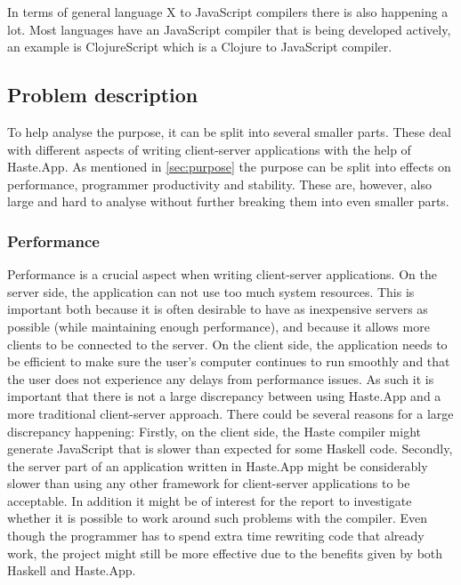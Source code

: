 \documentclass[a4paper]{article}
\begin{document}
In terms of general language X to JavaScript compilers there is also happening a lot. Most languages have an JavaScript compiler that is being developed actively, an example is ClojureScript which is a Clojure to JavaScript compiler.

\subsection{Problem description}
\label{sec:problem}
To help analyse the purpose, it can be split into several smaller parts. These deal with different aspects of writing client-server applications with the help of Haste.App. As mentioned in \cref{sec:purpose} the purpose can be split into effects on performance, programmer productivity and stability. These are, however, also large and hard to analyse without further breaking them into even smaller parts. 


\subsubsection{Performance}
Performance is a crucial aspect when writing client-server applications. On the server side, the application can not use too much system resources. This is important both because it is often desirable to have as inexpensive servers as possible (while maintaining enough performance), and because it allows more clients to be connected to the server. On the client side, the application needs to be efficient to make sure the user's computer continues to run smoothly and that the user does not experience any delays from performance issues. As such it is important that there is not a large discrepancy between using Haste.App and a more traditional client-server approach. There could be several reasons for a large discrepancy happening: Firstly, on the client side, the Haste compiler might generate JavaScript that is slower than expected for some Haskell code. Secondly, the server part of an application written in Haste.App might be considerably slower than using any other framework for client-server applications to be acceptable. In addition it might be of interest for the report to investigate whether it is possible to work around such problems with the compiler. Even though the programmer has to spend extra time rewriting code that already work, the project might still be more effective due to the benefits given by both Haskell and Haste.App. 
\end{document}

